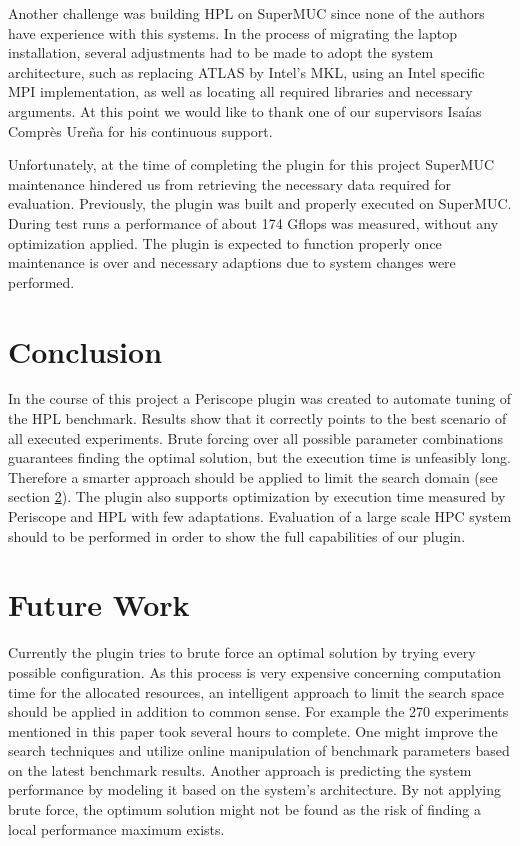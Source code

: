 \documentclass[10pt,twocolumn]{article}
\begin{document}
Another challenge was building HPL on SuperMUC since none of the authors have experience with this systems. In the process of migrating the laptop installation, several adjustments had to be made to adopt the system architecture, such as replacing ATLAS by Intel's MKL, using an Intel specific MPI implementation, as well as locating all required libraries and necessary arguments. At this point we would like to thank one of our supervisors Isa\'ias Compr\`es Ure\~na for his continuous support.

Unfortunately, at the time of completing the plugin for this project SuperMUC maintenance hindered us from retrieving the necessary data required for evaluation. Previously, the plugin was built and properly executed on SuperMUC. During test runs a performance of about 174 Gflops was measured, without any optimization applied. The plugin is expected to function properly once maintenance is over and necessary adaptions due to system changes were performed.

\section{Conclusion}
\label{sec:conclusion}

In the course of this project a Periscope plugin was created to automate tuning of the HPL benchmark. Results show that it correctly points to the best scenario of all executed experiments. Brute forcing over all possible parameter combinations guarantees finding the optimal solution, but the execution time is unfeasibly long. Therefore a smarter approach should be applied to limit the search domain (see section \ref{sec:futureWork}). The plugin also supports optimization by execution time measured by Periscope and HPL with few adaptations. Evaluation of a large scale HPC system should to be performed in order to show the full capabilities of our plugin.

\section{Future Work}
\label{sec:futureWork}

Currently the plugin tries to brute force an optimal solution by trying every possible configuration. As this process is very expensive concerning computation time for the allocated resources, an intelligent approach to limit the search space should be applied in addition to common sense. For example the 270 experiments mentioned in this paper took several hours to complete. One might improve the search techniques and utilize online manipulation of benchmark parameters based on the latest benchmark results. Another approach is predicting the system performance by modeling it based on the system's architecture. By not applying brute force, the optimum solution might not be found as the risk of finding a local performance maximum exists.
\end{document}
